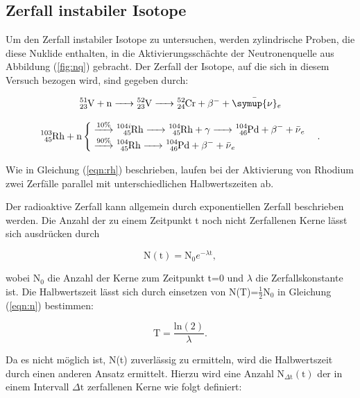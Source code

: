 \newpage
\subsection{Zerfall instabiler Isotope}

\noindent
Um den Zerfall instabiler Isotope zu untersuchen, werden zylindrische Proben, die diese Nuklide enthalten,
in die Aktivierungsschächte der Neutronenquelle aus Abbildung (\ref{fig:nq}) gebracht.
Der Zerfall der Isotope, auf die sich in diesem Versuch bezogen wird, sind gegeben durch:

\begin{equation}
\ce{_{23}^51V + n -> _{23}^52V -> _{24}^{52}Cr + }\beta^- \ce{+ \bar{\symup{\nu}}_e}
\end{equation}

\begin{equation}
\ce{^{103}_{45}Rh + n}
  \begin{cases}
  \overset{10\%}{\ce{->}} \ce{^{104i}_{45}Rh
  -> ^{104}_{45}Rh} + \gamma \ce{-> ^{104}_{46}Pd + \beta^{-} + \bar{\nu}_e} \\
  \overset{90\%}{\ce{->}} \ce{^{104}_{45}Rh -> ^{104}_{46}Pd + \beta^{-} + \bar{\nu}_e}
  \end{cases}.
  \label{eqn:rh}
\end{equation}

\noindent
Wie in Gleichung (\ref{eqn:rh}) beschrieben, laufen bei der Aktivierung von Rhodium zwei Zerfälle parallel mit unterschiedlichen Halbwertszeiten ab.

\noindent
Der radioaktive Zerfall kann allgemein durch exponentiellen Zerfall beschrieben werden.
Die Anzahl der zu einem Zeitpunkt t noch nicht Zerfallenen Kerne lässt sich ausdrücken durch

\begin{equation}
\text{N}(\text{t}) = \text{N}_0 e^{-\lambda \text{t}},
\label{eqn:n}
\end{equation}

\noindent
wobei $\text{N}_0$ die Anzahl der Kerne zum Zeitpunkt t=0 und $\lambda$ die Zerfallskonstante ist.
Die Halbwertszeit lässt sich durch einsetzen von N(T)=$\frac{1}{2} \text{N}_0$ in Gleichung (\ref{eqn:n}) bestimmen:

\begin{equation}
\text{T} = \frac{\text{ln}(2)}{\lambda}.
\label{eqn:T}
\end{equation}

\noindent
Da es nicht möglich ist, N(t) zuverlässig zu ermitteln, wird die Halbwertszeit durch einen anderen Ansatz ermittelt.
Hierzu wird eine Anzahl $\text{N}_{\Delta\text{t}}(\text{t})$ der in einem Intervall $\Delta\text{t}$ zerfallenen Kerne wie folgt definiert:

